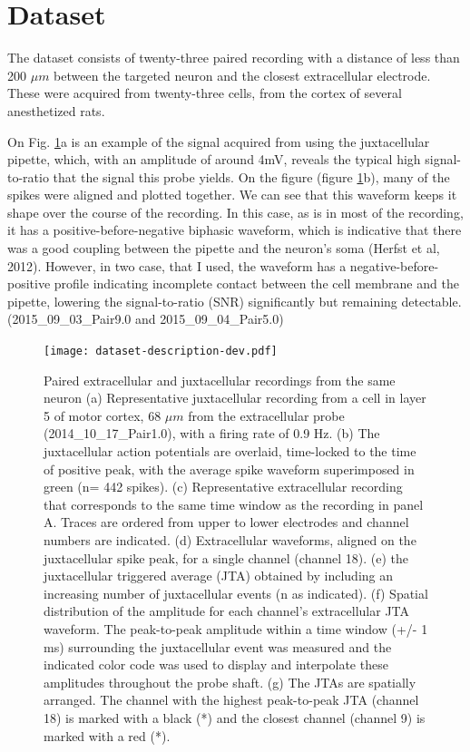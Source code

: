 \documentclass{report}
\begin{document}
\section{Dataset}
\label{sec:Netodataset}
The dataset consists of twenty-three paired recording with a distance of less than 200 $\mu m$ between the targeted neuron and the closest extracellular electrode. These were acquired from twenty-three cells, from the cortex of several anesthetized rats.

On Fig. \ref{fig:neto-data-description}a is an example of the signal acquired from using the juxtacellular pipette, which, with an amplitude of around 4mV, reveals the typical high signal-to-ratio that the signal this probe yields. On the figure (figure \ref{fig:neto-data-description}b), many of the spikes were aligned and  plotted together. We can see that this waveform keeps it shape over the course of the recording. In this case, as is in most of the recording, it has a positive-before-negative biphasic waveform, which is indicative that there was a good coupling between the pipette and the neuron's soma (Herfst et al, 2012). However, in two case, that I used, the waveform has a negative-before-positive profile indicating incomplete contact between the cell membrane and the pipette, lowering the signal-to-ratio (SNR) significantly but remaining detectable. (2015\_09\_03\_Pair9.0 and 2015\_09\_04\_Pair5.0)

\begin{figure}[!h]
	\centering
	\texttt{[image: dataset-description-dev.pdf]}
	\caption{Paired extracellular and juxtacellular recordings from the same neuron
(a) Representative juxtacellular recording from a cell in layer 5 of motor cortex, 68 $\mu m$ from the extracellular probe (2014\_10\_17\_Pair1.0), with a firing rate of 0.9 Hz. (b) The juxtacellular action potentials are overlaid, time-locked to the time of positive peak, with the average spike waveform superimposed in green (n= 442 spikes). (c) Representative extracellular recording that corresponds to the same time window as the recording in panel A. Traces are ordered from upper to lower electrodes and channel numbers are indicated. (d) Extracellular waveforms, aligned on the juxtacellular spike peak, for a single channel (channel 18). (e) the juxtacellular triggered average (JTA) obtained by including an increasing number of juxtacellular events (n as indicated). (f) Spatial distribution of the amplitude for each channel’s extracellular JTA waveform. The peak-to-peak amplitude within a time window (+/- 1 ms) surrounding the juxtacellular event was measured and the indicated color code was used to display and interpolate these amplitudes throughout the probe shaft. (g) The JTAs are spatially arranged. The channel with the highest peak-to-peak JTA (channel 18) is marked with a black (*) and the closest channel (channel 9) is marked with a red (*).
}
\label{fig:neto-data-description}
\end{figure}
\end{document}

